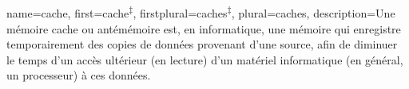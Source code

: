 {
	name=cache,
	first=cache\textsuperscript{$\ddagger$}, %
	firstplural=caches\textsuperscript{$\ddagger$},
	plural=caches,
	description={Une mémoire cache ou antémémoire est, en informatique, une mémoire qui enregistre temporairement des copies de données provenant d'une source, afin de diminuer le temps d'un accès ultérieur (en lecture) d'un matériel informatique (en général, un processeur) à ces données. \cite{wikipedia-cache}}%
}